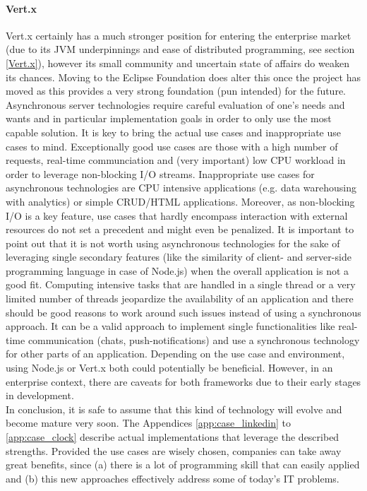 \paragraph{Vert.x} Vert.x certainly has a much stronger position for entering the enterprise market (due to its JVM underpinnings and ease of distributed programming, see section \ref{Vert.x}), however its small community and uncertain state of affairs do weaken its chances. Moving to the Eclipse Foundation does alter this once the project has moved as this provides a very strong foundation (pun intended) for the future.\\

Asynchronous server technologies require careful evaluation of one's needs and wants and in particular implementation goals in order to only use the most capable solution. It is key to bring the actual use cases and inappropriate use cases to mind. Exceptionally good use cases are those with a high number of requests, real-time communciation and (very important) low CPU workload in order to leverage non-blocking I/O streams. Inappropriate use cases for asynchronous technologies are CPU intensive applications (e.g. data warehousing with analytics) or simple CRUD/HTML applications. Moreover, as non-blocking I/O is a key feature, use cases that hardly encompass interaction with external resources do not set a precedent and might even be penalized. It is important to point out that it is not worth using asynchronous technologies for the sake of leveraging single secondary features (like the similarity of client- and server-side programming language in case of Node.js) when the overall application is not a good fit. Computing intensive tasks that are handled in a single thread or a very limited number of threads jeopardize the availability of an application and there should be good reasons to work around such issues instead of using a synchronous approach. It can be a valid approach to implement single functionalities like real-time communication (chats, push-notifications) and use a synchronous technology for other parts of an application. Depending on the use case and environment, using Node.js or Vert.x both could potentially be beneficial. However, in an enterprise context, there are caveats for both frameworks due to their early stages in development.\\

In conclusion, it is safe to assume that this kind of technology will evolve and become mature very soon. The Appendices \ref{app:case_linkedin} to \ref{app:case_clock} describe actual implementations that leverage the described strengths.
Provided the use cases are wisely chosen, companies can take away great benefits, since (a) there is a lot of programming skill
that can easily applied and (b) this new approaches effectively address some of today's IT problems.


